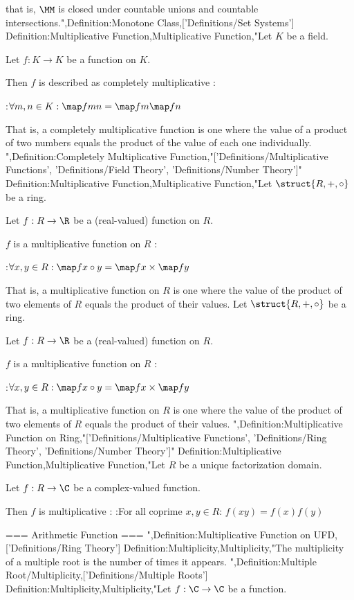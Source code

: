 that is,  $\MM$ is closed under countable unions and countable intersections.",Definition:Monotone Class,['Definitions/Set Systems']
Definition:Multiplicative Function,Multiplicative Function,"Let $K$ be a field.

Let $f: K \to K$ be a function on $K$.


Then $f$ is described as completely multiplicative :

:$\forall m, n \in K: \map f {m n} = \map f m \map f n$


That is, a completely multiplicative function is one where the value of a product of two numbers equals the product of the value of each one individually.
",Definition:Completely Multiplicative Function,"['Definitions/Multiplicative Functions', 'Definitions/Field Theory', 'Definitions/Number Theory']"
Definition:Multiplicative Function,Multiplicative Function,"Let $\struct {R, +, \circ}$ be a ring.

Let $f: R \to \R$ be a (real-valued) function on $R$.


$f$ is a multiplicative function on $R$ :

:$\forall x, y \in R: \map f {x \circ y} = \map f x \times \map f y$


That is, a multiplicative function on $R$ is one where the value of the product of two elements of $R$ equals the product of their values.
Let $\struct {R, +, \circ}$ be a ring.

Let $f: R \to \R$ be a (real-valued) function on $R$.


$f$ is a multiplicative function on $R$ :

:$\forall x, y \in R: \map f {x \circ y} = \map f x \times \map f y$


That is, a multiplicative function on $R$ is one where the value of the product of two elements of $R$ equals the product of their values.
",Definition:Multiplicative Function on Ring,"['Definitions/Multiplicative Functions', 'Definitions/Ring Theory', 'Definitions/Number Theory']"
Definition:Multiplicative Function,Multiplicative Function,"Let $R$ be a unique factorization domain.

Let $f : R \to \C$ be a complex-valued function.


Then $f$ is multiplicative :
:For all coprime $x, y\in R$: $f \left({x y}\right) = f \left({x}\right) f \left({y}\right)$


=== Arithmetic Function ===
",Definition:Multiplicative Function on UFD,['Definitions/Ring Theory']
Definition:Multiplicity,Multiplicity,"The multiplicity of a multiple root is the number of times it appears.
",Definition:Multiple Root/Multiplicity,['Definitions/Multiple Roots']
Definition:Multiplicity,Multiplicity,"Let $f: \C \to \C$ be a function.

